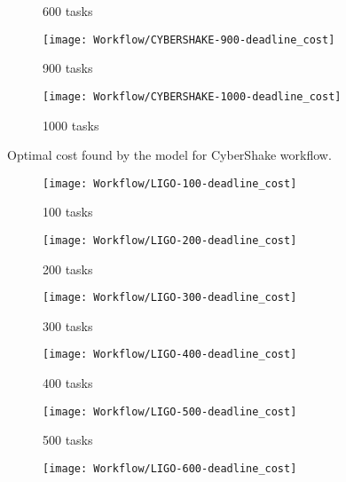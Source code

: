 {\begin{figure}[tb]
\begin{subfigure}[b]{0.45\textwidth}
         \caption{600 tasks}
       \end{subfigure}
       \begin{subfigure}[b]{0.45\textwidth}
         \texttt{[image: Workflow/CYBERSHAKE-900-deadline\_cost]}
         \caption{900 tasks}
       \end{subfigure}
       \begin{subfigure}[b]{0.45\textwidth}
         \texttt{[image: Workflow/CYBERSHAKE-1000-deadline\_cost]}
         \caption{1000 tasks}
       \end{subfigure}
       \caption{Optimal cost found by the model for CyberShake workflow.}
       \label{fig:workflow:cybershake}
     \end{figure}
     
     \begin{figure}[tb] 
       \centering       
       \begin{subfigure}[b]{0.45\textwidth}
         \texttt{[image: Workflow/LIGO-100-deadline\_cost]}
         \caption{100 tasks}
       \end{subfigure}
       \begin{subfigure}[b]{0.45\textwidth}
         \texttt{[image: Workflow/LIGO-200-deadline\_cost]}
         \caption{200 tasks}
       \end{subfigure}
       \begin{subfigure}[b]{0.45\textwidth}
         \texttt{[image: Workflow/LIGO-300-deadline\_cost]}
         \caption{300 tasks}
       \end{subfigure}
       \begin{subfigure}[b]{0.45\textwidth}
         \texttt{[image: Workflow/LIGO-400-deadline\_cost]}
         \caption{400 tasks}
       \end{subfigure}
       \begin{subfigure}[b]{0.45\textwidth}
         \texttt{[image: Workflow/LIGO-500-deadline\_cost]}
         \caption{500 tasks}
       \end{subfigure}
       \begin{subfigure}[b]{0.45\textwidth}
         \texttt{[image: Workflow/LIGO-600-deadline\_cost]}

\end{subfigure}
\end{figure}}
